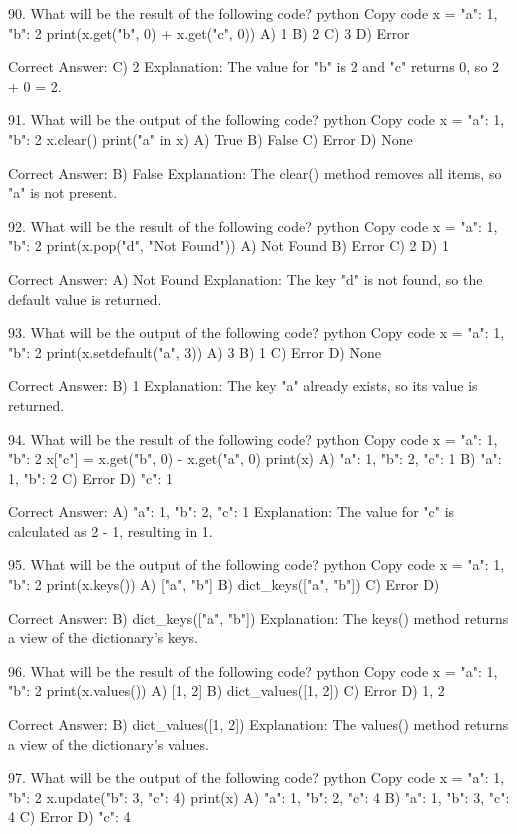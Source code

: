 90. What will be the result of the following code?
python
Copy code
x = {"a": 1, "b": 2}
print(x.get("b", 0) + x.get("c", 0))
A) 1
B) 2
C) 3
D) Error

Correct Answer: C) 2
Explanation: The value for "b" is 2 and "c" returns 0, so 2 + 0 = 2.

91. What will be the output of the following code?
python
Copy code
x = {"a": 1, "b": 2}
x.clear()
print("a" in x)
A) True
B) False
C) Error
D) None

Correct Answer: B) False
Explanation: The clear() method removes all items, so "a" is not present.

92. What will be the result of the following code?
python
Copy code
x = {"a": 1, "b": 2}
print(x.pop("d", "Not Found"))
A) Not Found
B) Error
C) 2
D) 1

Correct Answer: A) Not Found
Explanation: The key "d" is not found, so the default value is returned.

93. What will be the output of the following code?
python
Copy code
x = {"a": 1, "b": 2}
print(x.setdefault("a", 3))
A) 3
B) 1
C) Error
D) None

Correct Answer: B) 1
Explanation: The key "a" already exists, so its value is returned.

94. What will be the result of the following code?
python
Copy code
x = {"a": 1, "b": 2}
x["c"] = x.get("b", 0) - x.get("a", 0)
print(x)
A) {"a": 1, "b": 2, "c": 1}
B) {"a": 1, "b": 2}
C) Error
D) {"c": 1}

Correct Answer: A) {"a": 1, "b": 2, "c": 1}
Explanation: The value for "c" is calculated as 2 - 1, resulting in 1.

95. What will be the output of the following code?
python
Copy code
x = {"a": 1, "b": 2}
print(x.keys())
A) ["a", "b"]
B) dict_keys(["a", "b"])
C) Error
D) {}

Correct Answer: B) dict_keys(["a", "b"])
Explanation: The keys() method returns a view of the dictionary's keys.

96. What will be the result of the following code?
python
Copy code
x = {"a": 1, "b": 2}
print(x.values())
A) [1, 2]
B) dict_values([1, 2])
C) Error
D) {1, 2}

Correct Answer: B) dict_values([1, 2])
Explanation: The values() method returns a view of the dictionary's values.

97. What will be the output of the following code?
python
Copy code
x = {"a": 1, "b": 2}
x.update({"b": 3, "c": 4})
print(x)
A) {"a": 1, "b": 2, "c": 4}
B) {"a": 1, "b": 3, "c": 4}
C) Error
D) {"c": 4}

